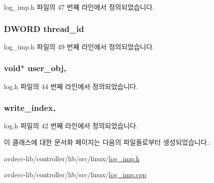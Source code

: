 log\+\_\+imp.\+h 파일의 47 번째 라인에서 정의되었습니다.

\subsubsection[{\texorpdfstring{thread\+\_\+id}{thread_id}}]{\setlength{\rightskip}{0pt plus 5cm}D\+W\+O\+RD thread\+\_\+id\hspace{0.3cm}{\ttfamily [private]}}\hypertarget{classavdecc__lib_1_1log__imp_afb0cb0dfb6676a8802089b63ae981f37}{}\label{classavdecc__lib_1_1log__imp_afb0cb0dfb6676a8802089b63ae981f37}


log\+\_\+imp.\+h 파일의 49 번째 라인에서 정의되었습니다.

\subsubsection[{\texorpdfstring{user\+\_\+obj}{user_obj}}]{\setlength{\rightskip}{0pt plus 5cm}void$\ast$ user\+\_\+obj\hspace{0.3cm}{\ttfamily [protected]}, {\ttfamily [inherited]}}\hypertarget{classavdecc__lib_1_1log_af3646c45b560aeab38e708886dec0d93}{}\label{classavdecc__lib_1_1log_af3646c45b560aeab38e708886dec0d93}


log.\+h 파일의 44 번째 라인에서 정의되었습니다.

\subsubsection[{\texorpdfstring{write\+\_\+index}{write_index}}]{ write\+\_\+index\hspace{0.3cm}{\ttfamily [protected]}, {\ttfamily [inherited]}}\hypertarget{classavdecc__lib_1_1log_a44d246646acf5f95a78a87d606f22a42}{}\label{classavdecc__lib_1_1log_a44d246646acf5f95a78a87d606f22a42}


log.\+h 파일의 42 번째 라인에서 정의되었습니다.



이 클래스에 대한 문서화 페이지는 다음의 파일들로부터 생성되었습니다.\+:\begin{DoxyCompactItemize}
\item 
avdecc-\/lib/controller/lib/src/linux/\hyperlink{linux_2log__imp_8h}{log\+\_\+imp.\+h}\item 
avdecc-\/lib/controller/lib/src/linux/\hyperlink{linux_2log__imp_8cpp}{log\+\_\+imp.\+cpp}\end{DoxyCompactItemize}
